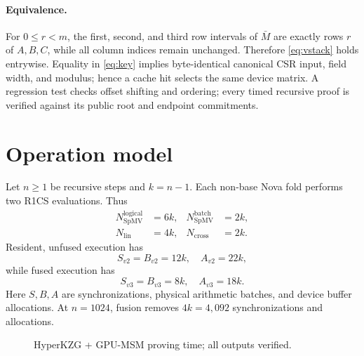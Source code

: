 \documentclass[9pt,twocolumn]{extarticle}
\begin{document}
\paragraph{Equivalence.}
For $0\leq r<m$, the first, second, and third row intervals of $\bar M$ are
exactly rows $r$ of $A,B,C$, while all column indices remain unchanged.
Therefore \cref{eq:vstack} holds entrywise.  Equality in \cref{eq:key} implies
byte-identical canonical CSR input, field width, and modulus; hence a cache hit
selects the same device matrix.  A regression test checks offset shifting and
ordering; every timed recursive proof is verified against its public root and
endpoint commitments.

\section{Operation model}

Let $n\geq1$ be recursive steps and $k=n-1$.  Each non-base Nova fold performs
two R1CS evaluations.  Thus
\begin{align}
  N_{\mathrm{SpMV}}^{\mathrm{logical}}&=6k,&
  N_{\mathrm{SpMV}}^{\mathrm{batch}}&=2k,\nonumber\\
  N_{\mathrm{lin}}&=4k,&N_{\mathrm{cross}}&=2k.             \label{eq:counts}
\end{align}
Resident, unfused execution has
\begin{equation}
  S_{v2}=B_{v2}=12k,\quad A_{v2}=22k,                        \label{eq:v2cost}
\end{equation}
while fused execution has
\begin{equation}
  S_{v3}=B_{v3}=8k,\quad A_{v3}=18k.                         \label{eq:v3cost}
\end{equation}
Here $S,B,A$ are synchronizations, physical arithmetic batches, and device
buffer allocations.  At $n=1024$, fusion removes $4k=4,092$ synchronizations
and allocations.

\begin{figure}[t]
\centering
{}
\caption{HyperKZG + GPU-MSM proving time; all outputs verified.}
\label{fig:prove-time}
\end{figure}
\end{document}
